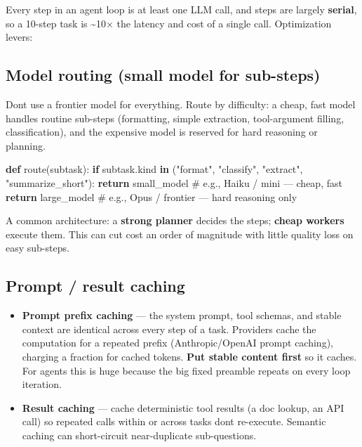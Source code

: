 \documentclass[11pt]{article}
\providecommand{\tightlist}{\setlength{\itemsep}{1pt}\setlength{\parskip}{0pt}}
\newenvironment{Shaded}{\begin{snugshade}}{\end{snugshade}}
\newcommand{\CommentTok}[1]{\textcolor[rgb]{0.48,0.49,0.49}{#1}}
\newcommand{\ControlFlowTok}[1]{\textcolor[rgb]{0.99,0.74,0.29}{\textbf{#1}}}
\newcommand{\KeywordTok}[1]{\textcolor[rgb]{0.81,0.81,0.76}{\textbf{#1}}}
\newcommand{\NormalTok}[1]{\textcolor[rgb]{0.81,0.81,0.76}{#1}}
\newcommand{\StringTok}[1]{\textcolor[rgb]{0.96,0.31,0.31}{#1}}
\begin{document}
Every step in an agent loop is at least one LLM call, and steps are largely \textbf{serial}, so a 10-step task is \textasciitilde10\(\times\) the latency and cost of a single call. Optimization levers:

\subsection{Model routing (small model for sub-steps)}\label{model-routing-small-model-for-sub-steps}

Don\textquotesingle t use a frontier model for everything. Route by difficulty: a cheap, fast model handles routine sub-steps (formatting, simple extraction, tool-argument filling, classification), and the expensive model is reserved for hard reasoning or planning.


\begin{Shaded}
\begin{Highlighting}[]
\KeywordTok{def}\NormalTok{ route(subtask):}
    \ControlFlowTok{if}\NormalTok{ subtask.kind }\KeywordTok{in}\NormalTok{ (}\StringTok{"format"}\NormalTok{, }\StringTok{"classify"}\NormalTok{, }\StringTok{"extract"}\NormalTok{, }\StringTok{"summarize\_short"}\NormalTok{):}
        \ControlFlowTok{return}\NormalTok{ small\_model      }\CommentTok{\# e.g., Haiku / mini  — cheap, fast}
    \ControlFlowTok{return}\NormalTok{ large\_model          }\CommentTok{\# e.g., Opus / frontier — hard reasoning only}
\end{Highlighting}
\end{Shaded}

A common architecture: a \textbf{strong planner} decides the steps; \textbf{cheap workers} execute them. This can cut cost an order of magnitude with little quality loss on easy sub-steps.

\subsection{Prompt / result caching}\label{prompt--result-caching}

\begin{itemize}
\tightlist
\item
  \textbf{Prompt prefix caching} --- the system prompt, tool schemas, and stable context are identical across every step of a task. Providers cache the computation for a repeated prefix (Anthropic/OpenAI prompt caching), charging a fraction for cached tokens. \textbf{Put stable content first} so it caches. For agents this is huge because the big fixed preamble repeats on every loop iteration.
\item
  \textbf{Result caching} --- cache deterministic tool results (a doc lookup, an API call) so repeated calls within or across tasks don\textquotesingle t re-execute. Semantic caching can short-circuit near-duplicate sub-questions.
\end{itemize}
\end{document}

